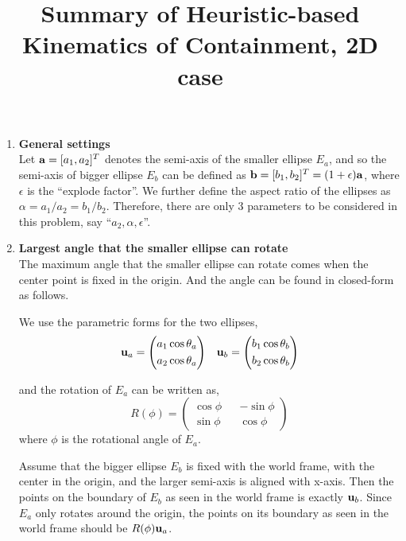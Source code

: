 \documentclass{article}
\begin{document}
\title{Summary of Heuristic-based Kinematics of Containment, 2D case}
\maketitle

\begin{enumerate}
\item {\bf General settings}\\
Let ${\bf a}=[a_1, a_2]^T$ denotes the semi-axis of the smaller ellipse $E_a$, and so the semi-axis of bigger ellipse $E_b$ can be defined as ${\bf b}=[b_1,b_2]^T=(1+\epsilon){\bf a}$, where $\epsilon$ is the ``explode factor''. We further define the aspect ratio of the ellipses as $\alpha = a_1/a_2 = b_1/b_2$. Therefore, there are only 3 parameters to be considered in this problem, say ``$a_2, \alpha, \epsilon$''.

\item {\bf Largest angle that the smaller ellipse can rotate}\\
The maximum angle that the smaller ellipse can rotate comes when the center point is fixed in the origin. And the angle can be found in closed-form as follows.

We use the parametric forms for the two ellipses,
\begin{equation}
\begin{aligned}
{\bf u}_a = \left( 
\begin{aligned}
a_1 \cos \theta_a\\
a_2 \cos \theta_a
\end{aligned}
\right) &&
{\bf u}_b = \left( 
\begin{aligned}
b_1 \cos \theta_b\\
b_2 \cos \theta_b
\end{aligned}
\right)
\end{aligned}
\end{equation}

and the rotation of $E_a$ can be written as,
\begin{equation}
R(\phi) = \left(
\begin{aligned}
\cos\phi && -\sin\phi\\
\sin\phi && \cos\phi
\end{aligned}\right)
\end{equation}
where $\phi$ is the rotational angle of $E_a$.

Assume that the bigger ellipse $E_b$ is fixed with the world frame, with the center in the origin, and the larger semi-axis is aligned with x-axis. Then the points on the boundary of $E_b$ as seen in the world frame is exactly ${\bf u}_b$. Since $E_a$ only rotates around the origin, the points on its boundary as seen in the world frame should be $R(\phi) {\bf u}_a$.


\end{enumerate}
\end{document}
